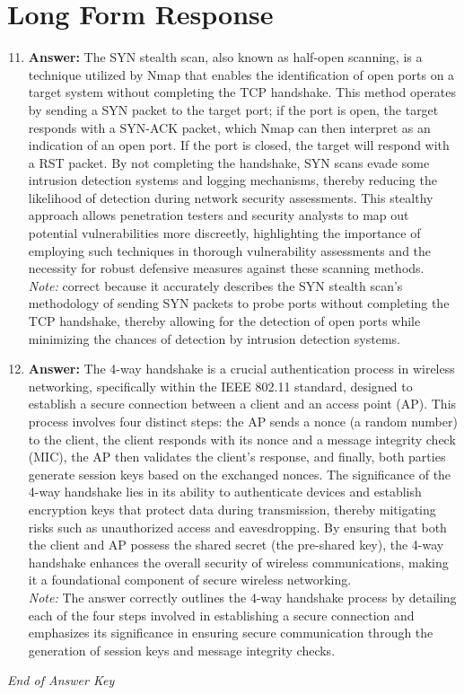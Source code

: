 \documentclass[12pt]{article}
\begin{document}
\section*{Long Form Response}
\begin{enumerate}[label=\arabic*.]
\setcounter{enumi}{10}
\item \textbf{Answer:} The SYN stealth scan, also known as half-open scanning, is a technique utilized by Nmap that enables the identification of open ports on a target system without completing the TCP handshake. This method operates by sending a SYN packet to the target port; if the port is open, the target responds with a SYN-ACK packet, which Nmap can then interpret as an indication of an open port. If the port is closed, the target will respond with a RST packet. By not completing the handshake, SYN scans evade some intrusion detection systems and logging mechanisms, thereby reducing the likelihood of detection during network security assessments. This stealthy approach allows penetration testers and security analysts to map out potential vulnerabilities more discreetly, highlighting the importance of employing such techniques in thorough vulnerability assessments and the necessity for robust defensive measures against these scanning methods.
\\ \textit{Note:} correct because it accurately describes the SYN stealth scan's methodology of sending SYN packets to probe ports without completing the TCP handshake, thereby allowing for the detection of open ports while minimizing the chances of detection by intrusion detection systems.
\item \textbf{Answer:} The 4-way handshake is a crucial authentication process in wireless networking, specifically within the IEEE 802.11 standard, designed to establish a secure connection between a client and an access point (AP). This process involves four distinct steps: the AP sends a nonce (a random number) to the client, the client responds with its nonce and a message integrity check (MIC), the AP then validates the client's response, and finally, both parties generate session keys based on the exchanged nonces. The significance of the 4-way handshake lies in its ability to authenticate devices and establish encryption keys that protect data during transmission, thereby mitigating risks such as unauthorized access and eavesdropping. By ensuring that both the client and AP possess the shared secret (the pre-shared key), the 4-way handshake enhances the overall security of wireless communications, making it a foundational component of secure wireless networking.
\\ \textit{Note:} The answer correctly outlines the 4-way handshake process by detailing each of the four steps involved in establishing a secure connection and emphasizes its significance in ensuring secure communication through the generation of session keys and message integrity checks.
\end{enumerate}

\vfill
\noindent\textit{End of Answer Key}
\end{document}
